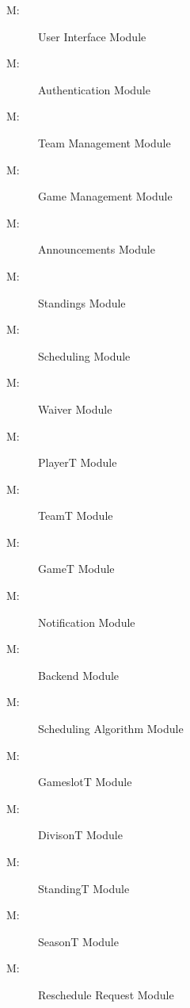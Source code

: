 \documentclass[12pt, titlepage]{article}
\newcounter{mnum}
\newcommand{\mthemnum}{M\themnum}
\begin{document}
\begin{description}
\item [ \mthemnum \label{mUI}:] User Interface Module
\item [ \mthemnum \label{mAuth}:] Authentication Module
\item [ \mthemnum \label{mTeamManagement}:] Team Management Module
\item [ \mthemnum \label{mGameManagement}:] Game Management Module
\item [ \mthemnum \label{mAnnouncements}:] Announcements Module
\item [ \mthemnum \label{mStandings}:] Standings Module
\item [ \mthemnum \label{mScheduling}:] Scheduling Module
\item [ \mthemnum \label{mWaiver}:] Waiver Module
\item [ \mthemnum \label{mPlayerT}:] PlayerT Module
\item [ \mthemnum \label{mTeamT}:] TeamT Module
\item [ \mthemnum \label{mGameT}:] GameT Module
\item [ \mthemnum \label{mNotification}:] Notification Module
\item [ \mthemnum \label{mBackend}:] Backend Module
\item [ \mthemnum \label{mAlgo}:] Scheduling Algorithm Module
\item [ \mthemnum \label{mGameslotT}:] GameslotT Module
\item [ \mthemnum \label{mDivisionT}:] DivisonT Module
\item [ \mthemnum \label{mStandingT}:] StandingT Module
\item [ \mthemnum \label{mSeasonT}:] SeasonT Module
\item [ \mthemnum \label{mRR}:] Reschedule Request Module


\end{description}
\end{document}
